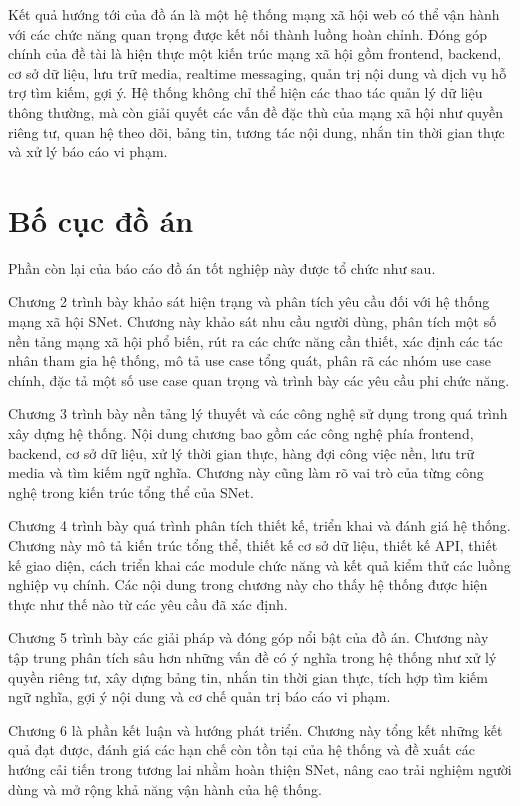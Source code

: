 \documentclass[../DoAn.tex]{subfiles}
\begin{document}
Kết quả hướng tới của đồ án là một hệ thống mạng xã hội web có thể vận hành với các chức năng quan trọng được kết nối thành luồng hoàn chỉnh. Đóng góp chính của đề tài là hiện thực một kiến trúc mạng xã hội gồm frontend, backend, cơ sở dữ liệu, lưu trữ media, realtime messaging, quản trị nội dung và dịch vụ hỗ trợ tìm kiếm, gợi ý. Hệ thống không chỉ thể hiện các thao tác quản lý dữ liệu thông thường, mà còn giải quyết các vấn đề đặc thù của mạng xã hội như quyền riêng tư, quan hệ theo dõi, bảng tin, tương tác nội dung, nhắn tin thời gian thực và xử lý báo cáo vi phạm.

\section{Bố cục đồ án}
\label{section:1.4}
Phần còn lại của báo cáo đồ án tốt nghiệp này được tổ chức như sau.

Chương 2 trình bày khảo sát hiện trạng và phân tích yêu cầu đối với hệ thống mạng xã hội SNet. Chương này khảo sát nhu cầu người dùng, phân tích một số nền tảng mạng xã hội phổ biến, rút ra các chức năng cần thiết, xác định các tác nhân tham gia hệ thống, mô tả use case tổng quát, phân rã các nhóm use case chính, đặc tả một số use case quan trọng và trình bày các yêu cầu phi chức năng.

Chương 3 trình bày nền tảng lý thuyết và các công nghệ sử dụng trong quá trình xây dựng hệ thống. Nội dung chương bao gồm các công nghệ phía frontend, backend, cơ sở dữ liệu, xử lý thời gian thực, hàng đợi công việc nền, lưu trữ media và tìm kiếm ngữ nghĩa. Chương này cũng làm rõ vai trò của từng công nghệ trong kiến trúc tổng thể của SNet.

Chương 4 trình bày quá trình phân tích thiết kế, triển khai và đánh giá hệ thống. Chương này mô tả kiến trúc tổng thể, thiết kế cơ sở dữ liệu, thiết kế API, thiết kế giao diện, cách triển khai các module chức năng và kết quả kiểm thử các luồng nghiệp vụ chính. Các nội dung trong chương này cho thấy hệ thống được hiện thực như thế nào từ các yêu cầu đã xác định.

Chương 5 trình bày các giải pháp và đóng góp nổi bật của đồ án. Chương này tập trung phân tích sâu hơn những vấn đề có ý nghĩa trong hệ thống như xử lý quyền riêng tư, xây dựng bảng tin, nhắn tin thời gian thực, tích hợp tìm kiếm ngữ nghĩa, gợi ý nội dung và cơ chế quản trị báo cáo vi phạm.

Chương 6 là phần kết luận và hướng phát triển. Chương này tổng kết những kết quả đạt được, đánh giá các hạn chế còn tồn tại của hệ thống và đề xuất các hướng cải tiến trong tương lai nhằm hoàn thiện SNet, nâng cao trải nghiệm người dùng và mở rộng khả năng vận hành của hệ thống.
\end{document}
